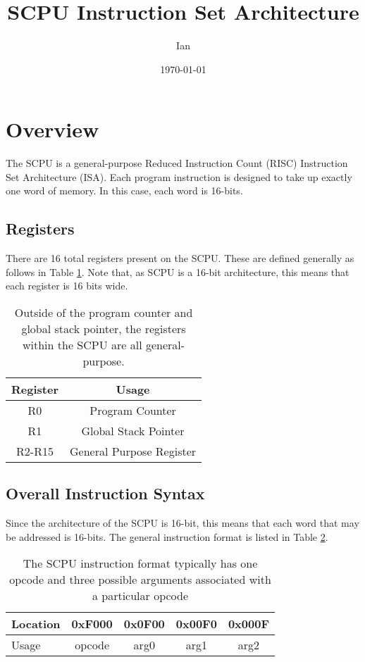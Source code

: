 \documentclass{article}
\title{SCPU Instruction Set Architecture}
\author{Ian}
\date{\today}
\begin{document}
\maketitle

\section{Overview}


The SCPU is a general-purpose Reduced Instruction Count (RISC) Instruction Set Architecture (ISA). Each program instruction is designed to take up exactly one word of memory. In this case, each word is 16-bits.

\subsection{Registers}

There are 16 total registers present on the SCPU. These are defined generally as follows in Table \ref{table:register-setup}. Note that, as SCPU is a 16-bit architecture, this means that each register is 16 bits wide.

\begin{table}[h!]
	\centering
	\begin{tabular}{c|c}
		\hline
		Register & Usage \\
		\hline
		R0 & Program Counter \\
		R1 & Global Stack Pointer \\
		R2-R15 & General Purpose Register \\
		\hline
	\end{tabular}
	\caption{Outside of the program counter and global stack pointer, the registers within the SCPU are all general-purpose.}
	\label{table:register-setup}
\end{table}

\subsection{Overall Instruction Syntax}

Since the architecture of the SCPU is 16-bit, this means that each word that may be addressed is 16-bits. The general instruction format is listed  in Table \ref{table:instruction-formatting}.

\begin{table}[h!]
	\centering
	\begin{tabular}{l|cccc}
		\hline
		Location & 0xF000 & 0x0F00 & 0x00F0 & 0x000F \\
		\hline
		Usage & opcode & arg0 & arg1 & arg2 \\
		\hline
	\end{tabular}
	\caption{The SCPU instruction format typically has one opcode and three possible arguments associated with a particular opcode}
	\label{table:instruction-formatting}
\end{table}
\end{document}
